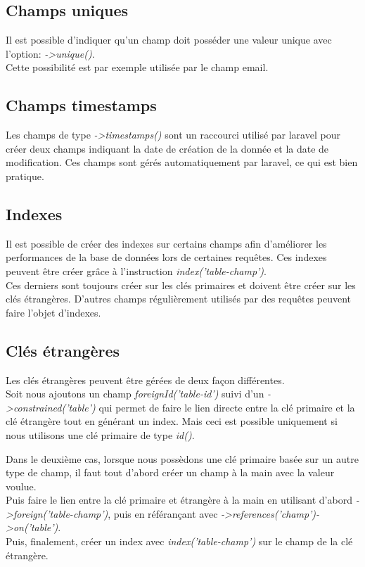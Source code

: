 \documentclass[
    iai, %
    il, %
]{heig-tb}
\begin{document}
\subsection{Champs uniques}
Il est possible d'indiquer qu'un champ doit posséder une valeur unique avec l'option: \emph{->unique()}.\\
Cette possibilité est par exemple utilisée par le champ email.

\subsection{Champs timestamps}
Les champs de type \emph{->timestamps()} sont un raccourci utilisé par \Gls{laravel} pour créer deux champs indiquant la date de création de la donnée et la date de modification. Ces champs sont gérés automatiquement par \Gls{laravel}, ce qui est bien pratique.

\subsection{Indexes}
Il est possible de créer des indexes sur certains champs afin d'améliorer les performances de la base de données lors de certaines requêtes. Ces indexes peuvent être créer grâce à l'instruction \emph{index('table-champ')}.\\
Ces derniers sont toujours créer sur les clés primaires et doivent être créer sur les clés étrangères. D'autres champs régulièrement utilisés par des requêtes peuvent faire l'objet d'indexes.

\subsection{Clés étrangères}
Les clés étrangères peuvent être gérées de deux façon différentes.\\
Soit nous ajoutons un champ \emph{foreignId('table-id')} suivi d'un \emph{->constrained('table')} qui permet de faire le lien directe entre la clé primaire et la clé étrangère tout en générant un index. Mais ceci est possible uniquement si nous utilisons une clé primaire de type \emph{id()}.

Dans le deuxième cas, lorsque nous possèdons une clé primaire basée sur un autre type de champ, il faut tout d'abord créer un champ à la main avec la valeur voulue.\\
Puis faire le lien entre la clé primaire et étrangère à la main en utilisant d'abord \emph{->foreign('table-champ')}, puis en référançant avec \emph{->references('champ')->on('table')}.\\
Puis, finalement, créer un index avec \emph{index('table-champ')} sur le champ de la clé étrangère.
\end{document}
